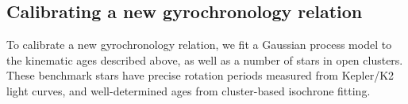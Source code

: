 \subsection{Calibrating a new gyrochronology relation}
\label{sec:calibration}

To calibrate a new gyrochronology relation, we fit a Gaussian process model to
the kinematic ages described above, as well as a number of stars in open
clusters.
These benchmark stars have precise rotation periods measured from Kepler/K2
light curves, and well-determined ages from cluster-based isochrone fitting.


